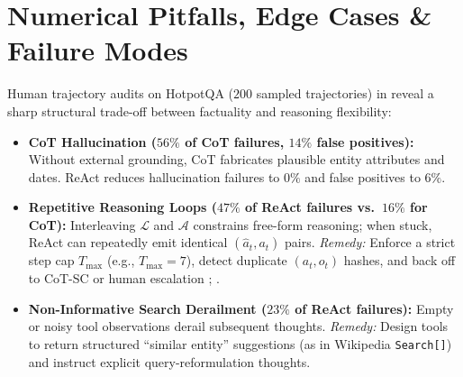 \documentclass[../../../../master.tex]{subfiles}
\begin{document}


\section{Numerical Pitfalls, Edge Cases \& Failure Modes}
\label{sec:agent:pitfalls}

\begin{pitfall}
Human trajectory audits on HotpotQA ($200$ sampled trajectories) in  reveal a sharp structural trade-off between factuality and reasoning flexibility:
\begin{itemize}
  \item \textbf{CoT Hallucination ($56\%$ of CoT failures, $14\%$ false positives):} Without external grounding, CoT fabricates plausible entity attributes and dates. ReAct reduces hallucination failures to $0\%$ and false positives to $6\%$.
  \item \textbf{Repetitive Reasoning Loops ($47\%$ of ReAct failures vs.\ $16\%$ for CoT):} Interleaving $\mathcal{L}$ and $\mathcal{A}$ constrains free-form reasoning; when stuck, ReAct can repeatedly emit identical $(\hat{a}_t, a_t)$ pairs. \emph{Remedy:} Enforce a strict step cap $T_{\max}$ (e.g., $T_{\max}=7$), detect duplicate $(a_t, o_t)$ hashes, and back off to CoT-SC or human escalation ; .
  \item \textbf{Non-Informative Search Derailment ($23\%$ of ReAct failures):} Empty or noisy tool observations derail subsequent thoughts. \emph{Remedy:} Design tools to return structured ``similar entity'' suggestions (as in Wikipedia \texttt{Search[]}) and instruct explicit query-reformulation thoughts.
\end{itemize}
\end{pitfall}
\end{document}

